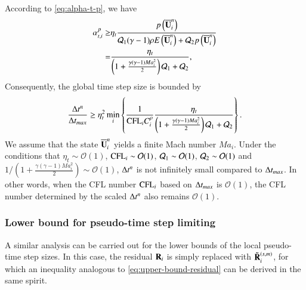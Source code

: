 According to \eqref{eq:alpha-t-p}, we have
\begin{equation}
    \begin{aligned}
        \label{eq:alpha-t-p-lb}
        \alpha_{t,i}^{p} 
        \geq & \eta_t 
        \frac{p\left(\overline{\mathbf{U}}^n_i\right)}
        {
        \mathcal{Q}_1
        (\gamma-1)
        \rho E\left(\overline{\mathbf{U}}^n_i\right)  + 
        \mathcal{Q}_2 
        p\left(\overline{\mathbf{U}}^n_i\right)
        }
        \\
        = &  
        \frac{\eta_t }
        {
        \left(1 + \frac{\gamma (\gamma-1) Ma_i^2}{2}\right)\mathcal{Q}_1
        +
        \mathcal{Q}_2 
        },
    \end{aligned}
\end{equation}
Consequently, the global time step size is bounded by
\begin{equation}
    \label{eq:delta-t-lb}
    \frac{\mathrm\Delta t^n}{\mathrm\Delta t_{max}} \geq 
    \eta_t^2
    \min_i
    \left\{
    \frac{1}{\text{CFL}_i C_i^\rho}
    \frac{\eta_t }
        {
        \left(1 + \frac{\gamma (\gamma-1) Ma_i^2}{2}\right)\mathcal{Q}_1  + 
        \mathcal{Q}_2 
        }
    \right\}.
\end{equation}
We assume that the state $\overline{\mathbf{U}}^n_i$ yields a finite Mach number $Ma_i$.
Under the conditions that $\eta_t\sim\mathcal{O}(1)$, 
$\text{CFL}_i\sim\mathcal{O}(1)$,
$\mathcal{Q}_1\sim\mathcal{O}(1)$,
$\mathcal{Q}_2\sim\mathcal{O}(1)$
and ${1}/\left(1 + \frac{\gamma (\gamma-1) Ma_i^2}{2}\right)\sim\mathcal{O}(1)$,
$\mathrm\Delta t^n$ is not infinitely small compared to $\mathrm\Delta t_{max}$.
In other words, when the CFL number $\text{CFL}_i$ based on $\mathrm\Delta t_{max}$ is $\mathcal{O}(1)$, 
the CFL number determined by the scaled $\mathrm\Delta t^n$ also remains $\mathcal{O}(1)$.

\subsubsection{Lower bound for pseudo-time step limiting}

A similar analysis can be carried out for the lower bounds of the local pseudo-time step sizes. In this case, the residual $\mathbf{R}_i$ is simply replaced with $\tilde{\mathbf{R}}_i^{(s,m)}$, for which an inequality analogous to \eqref{eq:upper-bound-residual} can be derived in the same spirit. 

